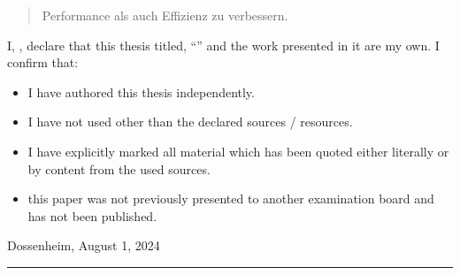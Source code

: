 \documentclass[
11pt, %
twoside, %
english, %
onehalfspacing, %
nolistspacing, %
liststotoc, %
parskip, %
headsepline, %
]{MastersDoctoralThesis} %
\begin{document}
\begin{abstract}
Performance als auch Effizienz zu verbessern.

\end{abstract}


\begin{acknowledgements}

\vspace{.4cm}



\end{acknowledgements}



\renewcommand{\authorshipname}{Statutory declaration}
\begin{declaration}

\noindent I, \authorname, declare that this thesis titled, \enquote{\ttitle} and the work presented in it are my own. I confirm that:

\begin{itemize} 
    \item I	have authored this thesis independently.
    \item I have not used other than the declared sources / resources.
    \item I have explicitly marked all material which has been quoted either literally or by content from the used sources.
    \item this paper was not previously presented to another examination board and has not been published.
\end{itemize}

\vspace{1.2cm}

\noindent Dossenheim, August 1, 2024\\[.4cm]
\rule[.8cm]{15cm}{.5pt} %
 
\end{declaration}


\end{document}
